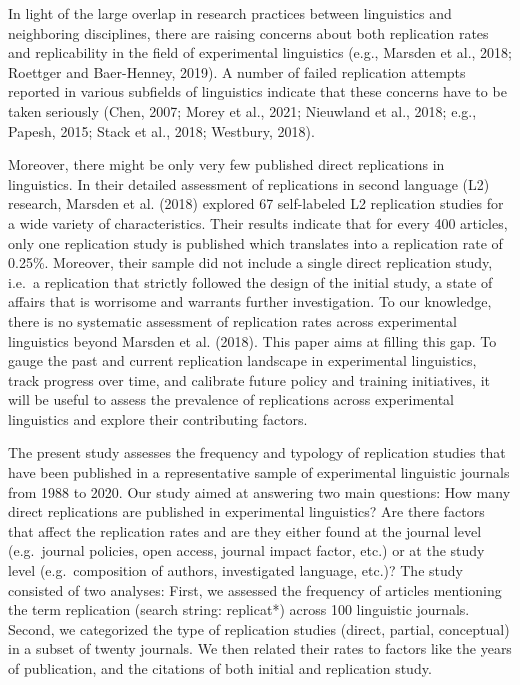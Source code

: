 \documentclass[]{elsarticle} %
\begin{document}
In light of the large overlap in research practices between linguistics and neighboring disciplines, there are raising concerns about both replication rates and replicability in the field of experimental linguistics (e.g., Marsden et al., 2018; Roettger and Baer-Henney, 2019). A number of failed replication attempts reported in various subfields of linguistics indicate that these concerns have to be taken seriously (Chen, 2007; Morey et al., 2021; Nieuwland et al., 2018; e.g., Papesh, 2015; Stack et al., 2018; Westbury, 2018).

Moreover, there might be only very few published direct replications in linguistics. In their detailed assessment of replications in second language (L2) research, Marsden et al. (2018) explored 67 self-labeled L2 replication studies for a wide variety of characteristics. Their results indicate that for every 400 articles, only one replication study is published which translates into a replication rate of 0.25\%. Moreover, their sample did not include a single direct replication study, i.e.~a replication that strictly followed the design of the initial study, a state of affairs that is worrisome and warrants further investigation. To our knowledge, there is no systematic assessment of replication rates across experimental linguistics beyond Marsden et al. (2018). This paper aims at filling this gap. To gauge the past and current replication landscape in experimental linguistics, track progress over time, and calibrate future policy and training initiatives, it will be useful to assess the prevalence of replications across experimental linguistics and explore their contributing factors.

The present study assesses the frequency and typology of replication studies that have been published in a representative sample of experimental linguistic journals from 1988 to 2020.
Our study aimed at answering two main questions:
How many direct replications are published in experimental linguistics?
Are there factors that affect the replication rates and are they either found at the journal level (e.g.~journal policies, open access, journal impact factor, etc.) or at the study level (e.g.~composition of authors, investigated language, etc.)?
The study consisted of two analyses:
First, we assessed the frequency of articles mentioning the term replication (search string: replicat*) across 100 linguistic journals.
Second, we categorized the type of replication studies (direct, partial, conceptual) in a subset of twenty journals. We then related their rates to factors like the years of publication, and the citations of both initial and replication study.
\end{document}
